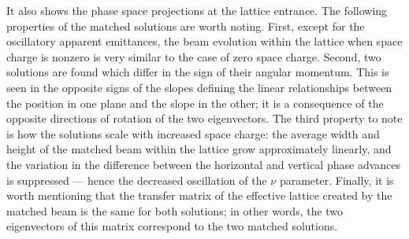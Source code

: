 %
It also shows the phase space projections at the lattice entrance. The following properties of the matched solutions are worth noting. First, except for the oscillatory apparent emittances, the beam evolution within the lattice when space charge is nonzero is very similar to the case of zero space charge. Second, two solutions are found which differ in the sign of their angular momentum. This is seen in the opposite signs of the slopes defining the linear relationships between the position in one plane and the slope in the other; it is a consequence of the opposite directions of rotation of the two eigenvectors. The third property to note is how the solutions scale with increased space charge: the average width and height of the matched beam within the lattice grow approximately linearly, and the variation in the difference between the horizontal and vertical phase advances is suppressed — hence the decreased oscillation of the $\nu$ parameter. Finally, it is worth mentioning that the transfer matrix of the effective lattice created by the matched beam is the same for both solutions; in other words, the two eigenvectors of this matrix correspond to the two matched solutions.  

